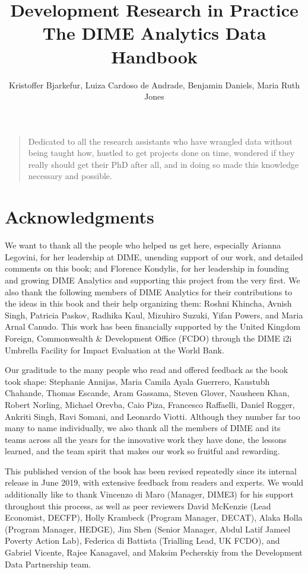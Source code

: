 \documentclass[
]{book}
\title{Development Research in Practice The DIME Analytics Data Handbook}
\author{Kristoffer Bjarkefur, Luiza Cardoso de Andrade, Benjamin Daniels, Maria Ruth Jones}
\date{}
\begin{document}
\maketitle

{
\setcounter{tocdepth}{1}
\tableofcontents
}
\begin{quote}
Dedicated to all the research assistants who have wrangled data without being taught how, hustled to get projects done on time, wondered if they really should get their PhD after all, and in doing so made this knowledge necessary and possible.
\end{quote}

\hypertarget{acknowledgments}{%
\chapter*{Acknowledgments}\label{acknowledgments}}

We want to thank all the people who helped us get here, especially Arianna Legovini, for her leadership at DIME, unending support of our work, and detailed comments on this book; and Florence Kondylis, for her leadership in founding and growing DIME Analytics and supporting this project from the very first.
We also thank the following members of DIME Analytics for their contributions to the ideas in this book and their help organizing them: Roshni Khincha, Avnish Singh, Patricia Paskov, Radhika Kaul, Mizuhiro Suzuki, Yifan Powers, and Maria Arnal Canudo. This work has been financially supported by the United Kingdom Foreign, Commonwealth \& Development Office (FCDO) through the DIME i2i Umbrella Facility for Impact Evaluation at the World Bank.

Our graditude to the many people who read and offered feedback as the book took shape:
Stephanie Annijas,
Maria Camila Ayala Guerrero,
Kaustubh Chahande,
Thomas Escande,
Aram Gassama,
Steven Glover,
Nausheen Khan,
Robert Norling,
Michael Orevba,
Caio Piza,
Francesco Raffaelli,
Daniel Rogger,
Ankriti Singh,
Ravi Somani, and
Leonardo Viotti.
Although they number far too many to name individually, we also thank all the members of DIME and its teams across all the years for the innovative work they have done, the lessons learned, and the team spirit that makes our work so fruitful and rewarding.

This published version of the book has been revised repeatedly since its internal release in June 2019, with extensive feedback from readers and experts. We would additionally like to thank Vincenzo di Maro (Manager, DIME3) for his support throughout this process, as well as peer reviewers David McKenzie (Lead Economist, DECFP), Holly Krambeck (Program Manager, DECAT), Alaka Holla (Program Manager, HEDGE), Jim Shen (Senior Manager, Abdul Latif Jameel Poverty Action Lab), Federica di Battista (Trialling Lead, UK FCDO), and Gabriel Vicente, Rajee Kanagavel, and Maksim Pecherskiy from the Development Data Partnership team.
\end{document}
